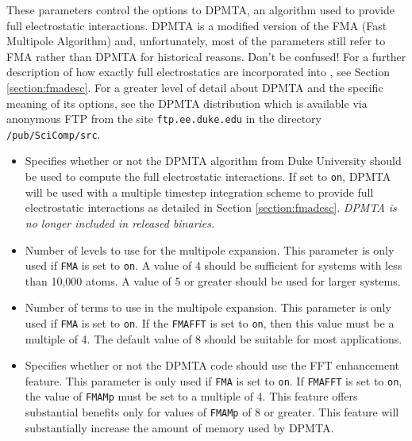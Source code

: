 These parameters control the options to DPMTA, an algorithm
used to provide full electrostatic interactions.  DPMTA is a
modified version of the FMA (Fast Multipole Algorithm) and, 
unfortunately, most of the parameters still refer to FMA
rather than DPMTA for historical reasons.  Don't be confused!
\prettypar
For a further description of how exactly full electrostatics
are incorporated into \NAMD, see Section \ref{section:fmadesc}.
For a greater level of detail about DPMTA and the specific
meaning of its options, see the DPMTA distribution which is
available via anonymous FTP from the site {\tt ftp.ee.duke.edu}
in the directory {\tt /pub/SciComp/src}.

\begin{itemize}

\item
{}
{Specifies whether or not 
the DPMTA algorithm from Duke University should be used 
to compute the full electrostatic interactions.  If set to 
{\tt on}, DPMTA will be used with a multiple timestep integration scheme 
to provide full electrostatic interactions as detailed in Section 
\ref{section:fmadesc}.  {\em DPMTA is no longer included in released binaries.}}

\item
{}
{Number of levels to use for the multipole expansion.  This parameter
is only used if {\tt FMA} is set to {\tt on}.  
A value of 4 should be sufficient for systems with less than 10,000 atoms.  
A value of 5 or greater should be used for larger systems. }

\item
{}
{Number of terms to use in the multipole expansion.  
This parameter is only used if {\tt FMA} is set to {\tt on}.  
If the {\tt FMAFFT} is set to {\tt on}, then this value must 
be a multiple of 4.  The default value of 8 should be suitable
for most applications.}

\item
{}
{Specifies whether or not the DPMTA code should use the FFT enhancement 
feature.  This parameter is only used if {\tt FMA} is set to {\tt on}.  
If {\tt FMAFFT} is set to {\tt on}, the value of {\tt FMAMp} must be 
set to a multiple of 4.  
This feature offers substantial benefits only for values 
of {\tt FMAMp} of 8 or greater.  This feature will substantially 
increase the amount of memory used by DPMTA.}


\end{itemize}
